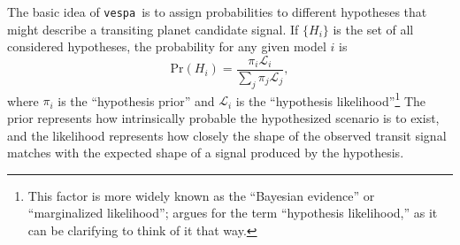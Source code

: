 \documentclass{emulateapj}
\newcommand{\eqlabel}[1]{\label{eq:#1}}
\newcommand{\vespa}{\texttt{vespa}}
\begin{document}
The basic idea of \vespa\ is to assign probabilities to different
hypotheses that might describe a transiting planet
candidate signal.  If $\{H_i\}$ is the set of all considered
hypotheses, the probability for any given model $i$ is
\begin{equation}
  \eqlabel{prob}
  \mathrm{Pr}\left(H_i\right) = \frac{\pi_i \mathcal
    L_i}{\displaystyle \sum_j \pi_j \mathcal L_j},
\end{equation}
where $\pi_i$ is the ``hypothesis prior'' and $\mathcal L_i$ is the
``hypothesis likelihood''\footnote{This factor is more widely known as
  the ``Bayesian evidence'' or ``marginalized likelihood'';
  \citet{Morton:2014b} argues for the term ``hypothesis likelihood,''
  as it can be clarifying to think of it that way.}
The prior represents how intrinsically probable the hypothesized
scenario is to exist, and the likelihood represents how closely the
shape of the observed transit signal matches with the expected shape
of a signal produced by the hypothesis.
\end{document}
